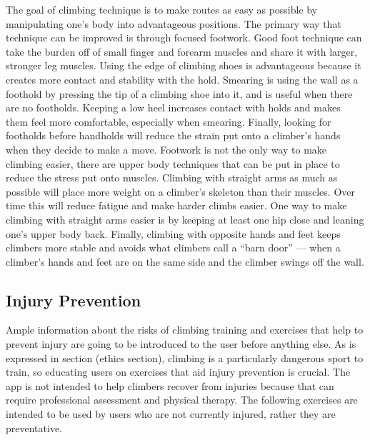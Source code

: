 \documentclass[10pt,twocolumn]{article}
\begin{document}
	The goal of climbing technique is to make routes as easy as possible by manipulating one’s body into advantageous positions. The primary way that technique can be improved is through focused footwork. Good foot technique can take the burden off of small finger and forearm muscles and share it with larger, stronger leg muscles. Using the edge of climbing shoes is advantageous because it creates more contact and stability with the hold. Smearing is using the wall as a foothold by pressing the tip of a climbing shoe into it, and is useful when there are no footholds. Keeping a low heel increases contact with holds and makes them feel more comfortable, especially when smearing. Finally, looking for footholds before handholds will reduce the strain put onto a climber's hands when they decide to make a move. 
	Footwork is not the only way to make climbing easier, there are upper body techniques that can be put in place to reduce the stress put onto muscles. Climbing with straight arms as much as possible will place more weight on a climber’s skeleton than their muscles. Over time this will reduce fatigue and make harder climbs easier. One way to make climbing with straight arms easier is by keeping at least one hip close and leaning one’s upper body back. Finally, climbing with opposite hands and feet keeps climbers more stable and avoids what climbers call a “barn door” — when a climber’s hands and feet are on the same side and the climber swings off the wall. \cite{rei_climbing_nodate}


\subsection{Injury Prevention}
    
    Ample information about the risks of climbing training and exercises that help to prevent injury are going to be introduced to the user before anything else. As is expressed in section (ethics section), climbing is a particularly dangerous sport to train, so educating users on exercises that aid injury prevention is crucial. The app is not intended to help climbers recover from injuries because that can require professional assessment and physical therapy. The following exercises are intended to be used by users who are not currently injured, rather they are preventative. 
\end{document}
